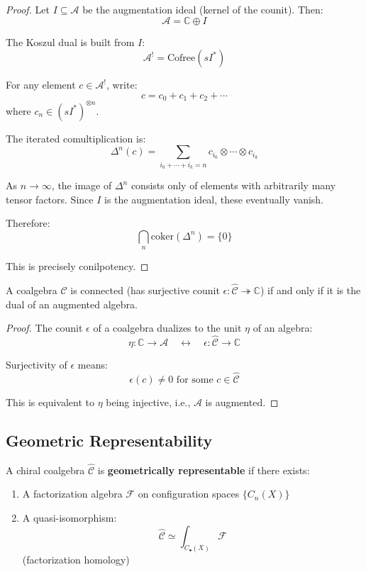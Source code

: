 \begin{proof}
Let $I \subseteq \mathcal{A}$ be the augmentation ideal (kernel of the counit). Then:
$$\mathcal{A} = \mathbb{C} \oplus I$$

The Koszul dual is built from $I$:
$$\mathcal{A}^! = \text{Cofree}(sI^*)$$

For any element $c \in \mathcal{A}^!$, write:
$$c = c_0 + c_1 + c_2 + \cdots$$
where $c_n \in (sI^*)^{\otimes n}$.

The iterated comultiplication is:
$$\Delta^n(c) = \sum_{i_0 + \cdots + i_k = n} c_{i_0} \otimes \cdots \otimes c_{i_k}$$

As $n \to \infty$, the image of $\Delta^n$ consists only of elements with arbitrarily 
many tensor factors. Since $I$ is the augmentation ideal, these eventually vanish.

Therefore:
$$\bigcap_n \text{coker}(\Delta^n) = \{0\}$$

This is precisely conilpotency.
\end{proof}

\begin{lemma}\label{lem:connectedness-augmentation}
A coalgebra $\widehat{\mathcal{C}}$ is connected (has surjective counit $\epsilon: \widehat{\mathcal{C}} 
\twoheadrightarrow \mathbb{C}$) if and only if it is the dual of an augmented algebra.
\end{lemma}

\begin{proof}
The counit $\epsilon$ of a coalgebra dualizes to the unit $\eta$ of an algebra:
$$\eta: \mathbb{C} \to \mathcal{A} \quad \leftrightarrow \quad \epsilon: \widehat{\mathcal{C}} 
\to \mathbb{C}$$

Surjectivity of $\epsilon$ means:
$$\epsilon(c) \neq 0 \text{ for some } c \in \widehat{\mathcal{C}}$$

This is equivalent to $\eta$ being injective, i.e., $\mathcal{A}$ is augmented.
\end{proof}

\subsection{Geometric Representability}

\begin{definition}\label{def:geom-representable-coalgebra}
A chiral coalgebra $\widehat{\mathcal{C}}$ is \textbf{geometrically representable} 
if there exists:
\begin{enumerate}
\item A factorization algebra $\mathcal{F}$ on configuration spaces $\{C_n(X)\}$
\item A quasi-isomorphism:
      $$\widehat{\mathcal{C}} \simeq \int_{C_\bullet(X)} \mathcal{F}$$
      (factorization homology)
\end{enumerate}
\end{definition}

